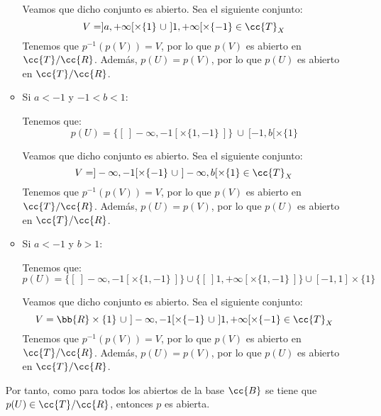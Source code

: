 \documentclass[12pt]{article}
\newcommand{\T}[0]{\cc{T}}
\begin{document}
\begin{ejercicio}[2.5 puntos]
\begin{enumerate}
\begin{itemize}
              Veamos que dicho conjunto es abierto. Sea el siguiente conjunto:
              $$V=]a,+\infty[\times \{1\}~\cup~]1, +\infty[ \times \{-1\}\in \T_X$$
              Tenemos que $p^{-1}(p(V)) = V$, por lo que $p(V)$ es abierto en $\T/\cc{R}$.
              Además, $p(U) = p(V)$, por lo que $p(U)$ es abierto en $\T/\cc{R}$.

              \item Si $a<-1$ y $-1<b<1$:
              
              Tenemos que:
              \begin{equation*}
                p(U) = \{[~]-\infty, -1[ \times \{1,-1\}~]\}~\cup~[-1,b[ \times \{1\}
              \end{equation*}

              Veamos que dicho conjunto es abierto. Sea el siguiente conjunto:
              $$V=]-\infty, -1[ \times \{-1\}~\cup~]-\infty,b[\times \{1\}\in \T_X$$
              Tenemos que $p^{-1}(p(V)) = V$, por lo que $p(V)$ es abierto en $\T/\cc{R}$.
              Además, $p(U) = p(V)$, por lo que $p(U)$ es abierto en $\T/\cc{R}$.

              \item Si $a<-1$ y $b>1$:
              
              Tenemos que:
              \begin{equation*}
                p(U) =
                \{[~]-\infty, -1[ \times \{1,-1\}~]\} \cup
                \{[~]1, +\infty[ \times \{1,-1\}~]\} \cup
                [-1,1] \times \{1\}
              \end{equation*}

              Veamos que dicho conjunto es abierto. Sea el siguiente conjunto:
              $$V=\bb{R}\times \{1\} ~\cup~
              ]-\infty, -1[ \times \{-1\}~\cup~]1, +\infty[ \times \{-1\}\in \T_X$$
              Tenemos que $p^{-1}(p(V)) = V$, por lo que $p(V)$ es abierto en $\T/\cc{R}$.
              Además, $p(U) = p(V)$, por lo que $p(U)$ es abierto en $\T/\cc{R}$.
            \end{itemize}

            Por tanto, como para todos los abiertos de la base $\cc{B}$ se tiene que $p(U)\in \T/\cc{R}$,
            entonces $p$ es abierta.

            \begin{comment}
              Consideramos ahora $U=]2,4[\times \{1\} \subset X$.
              Tenemos que $U=\left(]2,4[\times ]0,2[ \right)\cap X$,
              por lo que $U\in \T_X$. Tenemos que ver que $p(U)\notin \T/\cc{R}$, y para ello veremos que
              $U$ no es saturado. Tenemos que:
              \begin{equation*}
                  p(U) = \left\{\left[~]1, +\infty[ \times \{1,-1\}~\right]\right\}
                  \qquad
                  p^{-1}(p(U)) = ]1, +\infty[ \times \{1,-1\}
              \end{equation*}


\end{comment}
\end{enumerate}
\end{ejercicio}
\end{document}
